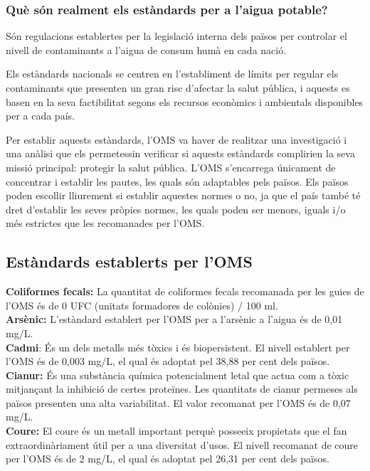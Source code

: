\subsubsection{Què són realment els estàndards per a l’aigua potable?}
Són regulacions establertes per la legislació interna dels països per controlar el nivell de contaminants a l’aigua de consum humà en cada nació.

Els estàndards nacionals se centren en l’establiment de límits per regular els contaminants que presenten un gran risc d’afectar la salut pública, i aquests es basen en la seva factibilitat segons els recursos econòmics i ambientals disponibles per a cada país.

Per establir aquests estàndards, l'OMS va haver de realitzar una investigació i una anàlisi que els permetessin verificar si aquests estàndards complirien la seva missió principal: protegir la salut pública. L'OMS s’encarrega únicament de concentrar i establir les pautes, les quals són adaptables pels països. Els països poden escollir lliurement si establir aquestes normes o no, ja que el país també té dret d’establir les seves pròpies normes, les quals poden ser menors, iguals i/o més estrictes que les recomanades per l'OMS.
\subsection*{Estàndards establerts per l’OMS}

\textbf{Coliformes fecals:} La quantitat de coliformes fecals recomanada per les guies de l’OMS és de 0 UFC (unitats formadores de colònies) / 100 ml.\\

\textbf{Arsènic:} L’estàndard establert per l’OMS per a l’arsènic a l’aigua és de 0,01 mg/L.\\

\textbf{Cadmi}: És un dels metalls més tòxics i és biopersistent. El nivell establert per l’OMS és de 0,003 mg/L, el qual és adoptat pel 38,88 per cent dels països. \\

\textbf{Cianur:} És una substància química potencialment letal que actua com a tòxic mitjançant la inhibició de certes proteïnes. Les quantitats de cianur permeses als països presenten una alta variabilitat. El valor recomanat per l'OMS és de 0,07 mg/L.\\

\textbf{Coure:}  El coure és un metall important perquè posseeix propietats que el fan extraordinàriament útil per a una diversitat d’usos. El nivell recomanat de coure per l’OMS és de 2 mg/L, el qual és adoptat pel 26,31 per cent dels països.\\

